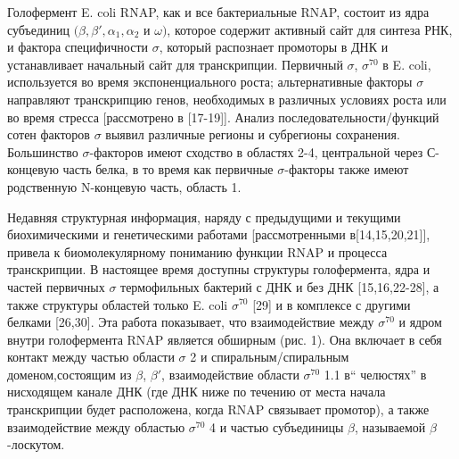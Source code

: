 \documentclass[a4paper,12pt]{article}
\begin{document}
    \par{Голофермент E. coli RNAP, как и все бактериальные RNAP, состоит из ядра субъединиц
    \((\beta,\beta',\alpha_1,\alpha_2\) и \(\omega)\), которое содержит активный сайт для синтеза РНК, и фактора
    специфичности \(\sigma\), который распознает промоторы в ДНК и устанавливает начальный сайт для транскрипции.
    Первичный \(\sigma\), \(\sigma^{70}\) в E. coli, используется во время экспоненциального роста; альтернативные
    факторы \(\sigma\) направляют транскрипцию генов, необходимых в различных условиях роста или во время стресса
    [рассмотрено в [17-19]]. Анализ последовательности/функций сотен факторов \(\sigma\) выявил различные регионы и
    субрегионы сохранения. Большинство \(\sigma\)-факторов имеют сходство в областях 2-4, центральной через С-концевую
    часть белка, в то время как первичные \(\sigma\)-факторы также имеют родственную N-концевую часть, область 1.}
    \par{Недавняя структурная информация, наряду с предыдущими и текущими биохимическими и генетическими работами
    [рассмотренными в[14,15,20,21]], привела к биомолекулярному пониманию функции RNAP и процесса транскрипции. В
    настоящее время доступны структуры голофермента, ядра и частей первичных \(\sigma\) термофильных бактерий с ДНК и без
    ДНК [15,16,22-28], а также структуры областей только E. coli \(\sigma^{70}\) [29] и в комплексе с другими белками
    [26,30]. Эта работа показывает, что взаимодействие между \(\sigma^{70}\) и ядром внутри голофермента RNAP является
    обширным (рис. 1). Она включает в себя контакт между частью области \(\sigma\) 2 и спиральным/спиральным
    доменом,состоящим из \(\beta\), \(\beta'\), взаимодействие области \(\sigma^{70}\) 1.1 в“ челюстях” в нисходящем
    канале ДНК (где ДНК ниже по течению от места начала транскрипции будет расположена, когда RNAP связывает промотор), а
    также взаимодействие между областью \(\sigma^{70}\) 4 и частью субъединицы \(\beta\), называемой \(\beta\)-лоскутом.}
\end{document}
